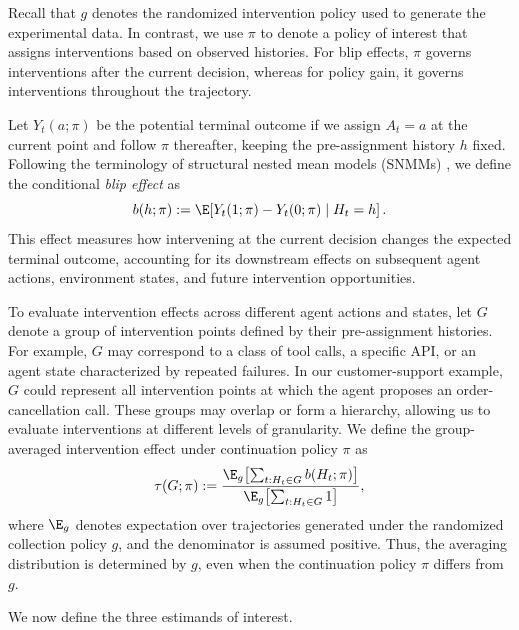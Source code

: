 Recall that $g$ denotes the randomized intervention policy used to generate the experimental data.
In contrast, we use $\pi$ to denote a policy of interest that assigns interventions based on observed histories.
For blip effects, $\pi$ governs interventions after the current decision, whereas for policy gain, it governs interventions throughout the trajectory.


Let $Y_t(a;\pi)$ be the potential terminal outcome if we assign $A_t=a$ at the current point and follow $\pi$ thereafter, keeping the pre-assignment history $h$ fixed.
Following the terminology of structural nested mean models (SNMMs) \citep{vansteelandt2014snmm}, we define the conditional {\em blip effect} as
\begin{equation}
    b(h;\pi)
    :=
    \E\!\left[
        Y_t(1;\pi)-Y_t(0;\pi)
        \mid H_t=h
    \right].
    \label{eq:conditional-blip}
\end{equation}
This effect measures how intervening at the current decision changes the expected terminal outcome, accounting for its downstream effects on subsequent agent actions, environment states, and future intervention opportunities.

To evaluate intervention effects across different agent actions and states, let $G$ denote a group of intervention points defined by their pre-assignment histories.
For example, $G$ may correspond to a class of tool calls, a specific API, or an agent state characterized by repeated failures.
In our customer-support example, $G$ could represent all intervention points at which the agent proposes an order-cancellation call.
These groups may overlap or form a hierarchy, allowing us to evaluate interventions at different levels of granularity.
We define the group-averaged intervention effect under continuation policy $\pi$ as
\begin{equation}
    \tau(G;\pi)
    :=
    \frac{
        \E_g\!\left[
            \sum_{t:H_t\in G} b(H_t;\pi)
        \right]
    }{
        \E_g\!\left[
            \sum_{t:H_t\in G}1
        \right]
    }, %
    \label{eq:blip}
\end{equation}
where $\E_g$ denotes expectation over trajectories generated under the randomized collection policy $g$, and the denominator is assumed positive.
Thus, the averaging distribution is determined by $g$, even when the continuation policy $\pi$ differs from $g$.

We now define the three estimands of interest.
